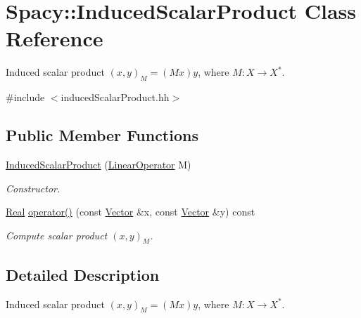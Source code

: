 \hypertarget{classSpacy_1_1InducedScalarProduct}{\section{Spacy\-:\-:Induced\-Scalar\-Product Class Reference}
\label{classSpacy_1_1InducedScalarProduct}
}


Induced scalar product $(x,y)_M = (Mx)y$, where $M:X\rightarrow X^*$.  




{\ttfamily \#include $<$induced\-Scalar\-Product.\-hh$>$}

\subsection*{Public Member Functions}
\begin{DoxyCompactItemize}
\item 
\hyperlink{classSpacy_1_1InducedScalarProduct_a8cf4d6c0823b6c9d59be783d3627130e}{Induced\-Scalar\-Product} (\hyperlink{classSpacy_1_1LinearOperator}{Linear\-Operator} M)
\begin{DoxyCompactList}\small\item\em Constructor. \end{DoxyCompactList}\item 
\hypertarget{classSpacy_1_1InducedScalarProduct_ab16021f05080b32714276f9b125df8af}{\hyperlink{classSpacy_1_1Real}{Real} \hyperlink{classSpacy_1_1InducedScalarProduct_ab16021f05080b32714276f9b125df8af}{operator()} (const \hyperlink{classSpacy_1_1Vector}{Vector} \&x, const \hyperlink{classSpacy_1_1Vector}{Vector} \&y) const }\label{classSpacy_1_1InducedScalarProduct_ab16021f05080b32714276f9b125df8af}

\begin{DoxyCompactList}\small\item\em Compute scalar product $(x,y)_M$. \end{DoxyCompactList}\end{DoxyCompactItemize}


\subsection{Detailed Description}
Induced scalar product $(x,y)_M = (Mx)y$, where $M:X\rightarrow X^*$. 

